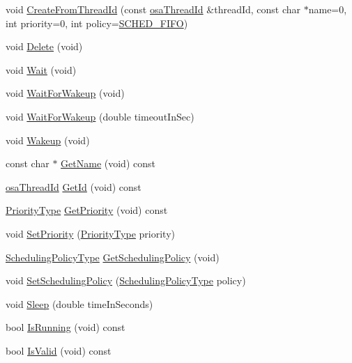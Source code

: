 \begin{DoxyCompactItemize}
\item 
void \hyperlink{classosa_thread_a080f9dbe273fad070d94a411684b4ca2}{Create\+From\+Thread\+Id} (const \hyperlink{classosa_thread_id}{osa\+Thread\+Id} \&thread\+Id, const char $\ast$name=0, int priority=0, int policy=\hyperlink{osa_thread_8h_ab998332c6538a029b4eed398b7a423da}{S\+C\+H\+E\+D\+\_\+\+F\+I\+F\+O})
\item 
void \hyperlink{classosa_thread_abc8c57e73e11e24c3b5203d520ecd877}{Delete} (void)
\item 
void \hyperlink{classosa_thread_a94895a862be656d41e113f64dfb6d274}{Wait} (void)
\item 
void \hyperlink{classosa_thread_adaa096f5ae24c775c7f3011affc251e2}{Wait\+For\+Wakeup} (void)
\item 
void \hyperlink{classosa_thread_a9a82d911b12b9a111527f90ba3793d82}{Wait\+For\+Wakeup} (double timeout\+In\+Sec)
\item 
void \hyperlink{classosa_thread_a6bdb340d306cbecfca251d5f8dcd7d50}{Wakeup} (void)
\item 
const char $\ast$ \hyperlink{classosa_thread_aacbb9a3ec74bc5d3ee924f986dd681d6}{Get\+Name} (void) const 
\item 
\hyperlink{classosa_thread_id}{osa\+Thread\+Id} \hyperlink{classosa_thread_a1700ab631890de1d6211eb9f635fc0cc}{Get\+Id} (void) const 
\item 
\hyperlink{osa_thread_8h_a118e6f24bad4e18e7d179bb41166ae8c}{Priority\+Type} \hyperlink{classosa_thread_a814d2d55a2c028fa282a6ed99e3bb068}{Get\+Priority} (void) const 
\item 
void \hyperlink{classosa_thread_afe4e333816d8d6c5765d61f03bd90a11}{Set\+Priority} (\hyperlink{osa_thread_8h_a118e6f24bad4e18e7d179bb41166ae8c}{Priority\+Type} priority)
\item 
\hyperlink{osa_thread_8h_a52b64f646398cfbb451b035825642724}{Scheduling\+Policy\+Type} \hyperlink{classosa_thread_a9e6f22030b4ef6c0c0eca6408696d3e0}{Get\+Scheduling\+Policy} (void)
\item 
void \hyperlink{classosa_thread_a58f2be5f8b86d296fae2061a16803f26}{Set\+Scheduling\+Policy} (\hyperlink{osa_thread_8h_a52b64f646398cfbb451b035825642724}{Scheduling\+Policy\+Type} policy)
\item 
void \hyperlink{classosa_thread_af7490cefd464c7ea87b287f70e4dc833}{Sleep} (double time\+In\+Seconds)
\item 
bool \hyperlink{classosa_thread_a3dbeece9c55c7730d229e715c3adf29f}{Is\+Running} (void) const 
\item 
bool \hyperlink{classosa_thread_ad0199fe60a017dac38be9b8211ea7206}{Is\+Valid} (void) const 
\end{DoxyCompactItemize}
